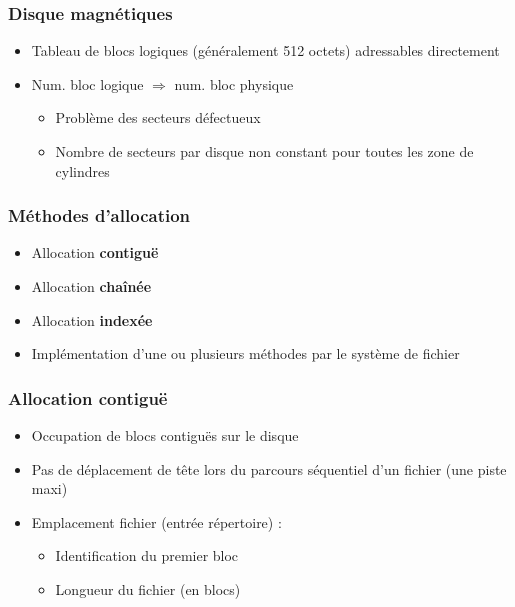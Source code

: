 \begin{frame}
\frametitle{Disque magnétiques}
\begin{itemize}
\item Tableau de blocs logiques (généralement 512 octets) adressables directement
\item Num. bloc logique $\Longrightarrow$ num. bloc physique
\begin{itemize}
\item Problème des secteurs défectueux
\item Nombre de secteurs par disque non constant pour toutes les zone de cylindres
\end{itemize}
\end{itemize}
\end{frame}

\begin{frame}
\frametitle{Méthodes d'allocation}
\begin{itemize}
\item Allocation \textbf{contiguë}
\item Allocation \textbf{chaînée}
\item Allocation \textbf{indexée}

\item Implémentation d'une ou plusieurs méthodes par le système de fichier
\end{itemize}
\end{frame}

\begin{frame}
\frametitle{Allocation contiguë}
\begin{itemize}
\item Occupation de blocs contiguës sur le disque
\item Pas de déplacement de tête lors du parcours séquentiel d'un fichier (une piste maxi)
\item Emplacement fichier (entrée répertoire) :
\begin{itemize}
\item Identification du premier bloc
\item Longueur du fichier (en blocs)
\end{itemize}
\end{itemize}
\end{frame}


